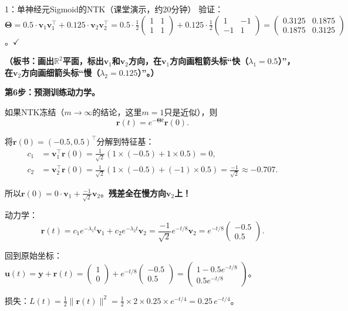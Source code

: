 \documentclass[11pt,a4paper]{article}
\newcommand{\R}{\mathbb{R}}
\newcommand{\bTheta}{\boldsymbol{\Theta}}
\newcommand{\bu}{\mathbf{u}}
\newcommand{\by}{\mathbf{y}}
\newcommand{\br}{\mathbf{r}}
\newcommand{\bv}{\mathbf{v}}
\begin{document}
\begin{handcalc}{1：单神经元Sigmoid的NTK（课堂演示，约20分钟）}
验证：$\bTheta = 0.5\cdot\bv_1\bv_1^\top + 0.125\cdot\bv_2\bv_2^\top = 0.5\cdot\frac{1}{2}\begin{pmatrix}1&1\\1&1\end{pmatrix} + 0.125\cdot\frac{1}{2}\begin{pmatrix}1&-1\\-1&1\end{pmatrix} = \begin{pmatrix}0.3125&0.1875\\0.1875&0.3125\end{pmatrix}$。$\checkmark$

\textbf{（板书：画出$\R^2$平面，标出$\bv_1$和$\bv_2$方向，在$\bv_1$方向画粗箭头标``快（$\lambda_1=0.5$）''，在$\bv_2$方向画细箭头标``慢（$\lambda_2=0.125$）''。）}

\bigskip
\textbf{第6步：预测训练动力学。}

如果NTK冻结（$m\to\infty$的结论，这里$m=1$只是近似），则
\[
\br(t) = e^{-\bTheta t}\br(0).
\]

将$\br(0)=(-0.5, 0.5)^\top$分解到特征基：
\begin{align}
c_1 &= \bv_1^\top\br(0) = \frac{1}{\sqrt{2}}(1\times(-0.5) + 1\times 0.5) = 0, \\
c_2 &= \bv_2^\top\br(0) = \frac{1}{\sqrt{2}}(1\times(-0.5) + (-1)\times 0.5) = \frac{-1}{\sqrt{2}} \approx -0.707.
\end{align}

所以$\br(0) = 0\cdot\bv_1 + \frac{-1}{\sqrt{2}}\bv_2$。\textbf{残差全在慢方向$\bv_2$上！}

动力学：
\[
\br(t) = c_1 e^{-\lambda_1 t}\bv_1 + c_2 e^{-\lambda_2 t}\bv_2 = \frac{-1}{\sqrt{2}}e^{-t/8}\bv_2 = e^{-t/8}\begin{pmatrix}-0.5\\0.5\end{pmatrix}.
\]

回到原始坐标：$\bu(t) = \by + \br(t) = \begin{pmatrix}1\\0\end{pmatrix} + e^{-t/8}\begin{pmatrix}-0.5\\0.5\end{pmatrix} = \begin{pmatrix}1-0.5e^{-t/8}\\0.5e^{-t/8}\end{pmatrix}$。

损失：$L(t) = \frac{1}{2}\|\br(t)\|^2 = \frac{1}{2}\times 2\times 0.25\times e^{-t/4} = 0.25\,e^{-t/4}$。


\end{handcalc}
\end{document}
